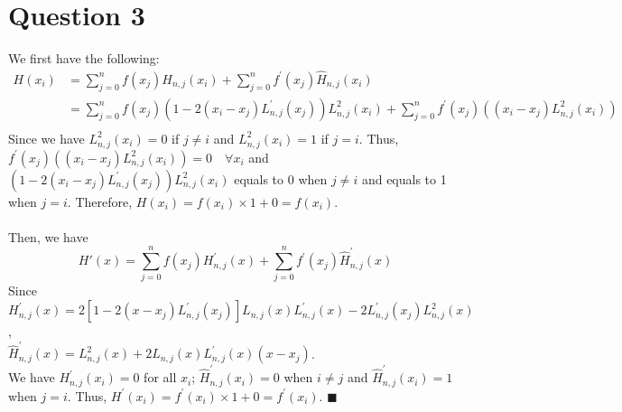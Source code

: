 \documentclass[11pt]{article}
\begin{document}
\section*{Question 3}
We first have the following:
\begin{equation*}
\begin{aligned}
H(x_i) &= \sum_{j = 0}^{n}f(x_j)H_{n,j}(x_i) + \sum_{j =0 }^{n} f^{'}(x_j)\hat{H}_{n,j}(x_i)\\
 & = \sum_{j = 0}^{n} f(x_j)(1 -2(x_i-x_j)L^{'}_{n,j}(x_j))L^2_{n,j}(x_i) + \sum_{j =0 }^{n} f^{'}(x_j)((x_i-x_j)L^2_{n,j}(x_i))\\
\end{aligned}
\end{equation*}
Since we have $ L^2_{n,j}(x_i) = 0 $ if $ j \ne i $ and $ L^2_{n,j}(x_i) = 1 $ if $ j = i $. Thus, $ f^{'}(x_j)((x_i-x_j)L^2_{n,j}(x_i)) = 0 \quad \forall x_i $ and $ (1 -2(x_i-x_j)L^{'}_{n,j}(x_j))L^2_{n,j}(x_i) $ equals to 0 when $ j \ne i $ and equals to 1 when $ j = i $. Therefore, $H(x_i) = f(x_i)\times 1 + 0 = f(x_i)$.\\\\
Then, we have 
\[ H'(x) = \sum_{j = 0}^{n}f(x_j)H^{'}_{n,j}(x) + \sum_{j =0 }^{n} f^{'}(x_j)\hat{H}^{'}_{n,j}(x) \] 
Since $ H^{'}_{n,j}(x) = 2[1-2(x-x_j)L^{'}_{n,j}(x_j)]L_{n,j}(x)L^{'}_{n,j}(x) -2L_{n,j}^{'}(x_j)L_{n,j}^{2}(x) $,\\
$ \hat{H}^{'}_{n,j}(x) = L_{n,j}^2(x) + 2L_{n,j}(x)L^{'}_{n,j}(x)(x-x_j) $. \\
We have $H^{'}_{n,j}(x_i) = 0$ for all $ x_i $; $ \hat{H}_{n,j}^{'}(x_i) = 0 $ when $ i \ne j $ and $ \hat{H}_{n,j}^{'}(x_i) = 1 $ when $ j = i $.
Thus, $ H^{'}(x_i) = f^{'}(x_i) \times 1 + 0 = f^{'}(x_i) $. \hfill $ \blacksquare $
\end{document}
